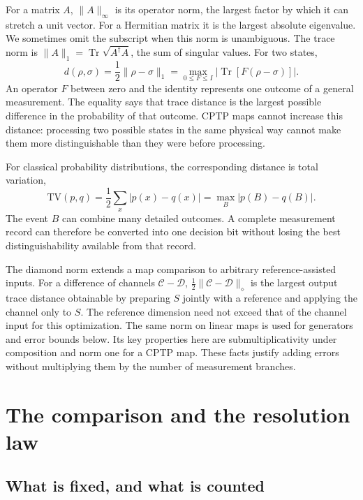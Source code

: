 \documentclass[11pt,a4paper]{article}
\numberwithin{equation}{section}
\theoremstyle{remark}
\DeclareMathOperator{\Tr}{Tr}
\begin{document}
For a matrix $A$, $\|A\|_\infty$ is its operator norm, the largest factor by
which it can stretch a unit vector. For a Hermitian matrix it is the largest
absolute eigenvalue. We sometimes omit the subscript when this norm is
unambiguous. The trace norm is
$\|A\|_1=\Tr\sqrt{A^\dagger A}$, the sum of singular values. For two states,
\begin{equation}
 d(\rho,\sigma)=\frac12\|\rho-\sigma\|_1
 =\max_{0\le F\le I}|\Tr[F(\rho-\sigma)]|.
\end{equation}
An operator $F$ between zero and the identity represents one outcome of a
general measurement. The equality says that trace distance is the largest
possible difference in the probability of that outcome. CPTP maps cannot
increase this distance: processing two possible states in the same physical
way cannot make them more distinguishable than they were before processing.

For classical probability distributions, the corresponding distance is
total variation,
\begin{equation}
 \mathrm{TV}(p,q)=\frac12\sum_x|p(x)-q(x)|
 =\max_B|p(B)-q(B)|.
\end{equation}
The event $B$ can combine many detailed outcomes. A complete measurement
record can therefore be converted into one decision bit without losing
the best distinguishability available from that record.

The diamond norm extends a map comparison to arbitrary reference-assisted
inputs. For a difference of channels $\mathcal C-\mathcal D$,
$\tfrac12\|\mathcal C-\mathcal D\|_\diamond$ is the largest output trace
distance obtainable by preparing $S$ jointly with a reference and applying
the channel only to $S$. The reference dimension need not exceed that of
the channel input for this optimization. The same norm on linear maps is
used for generators and error bounds below. Its key properties here are
submultiplicativity under composition and norm one for a CPTP map. These
facts justify adding errors without multiplying them by the number of
measurement branches.

\section{The comparison and the resolution law}
\label{sec:experiment}

\subsection{What is fixed, and what is counted}
\end{document}
